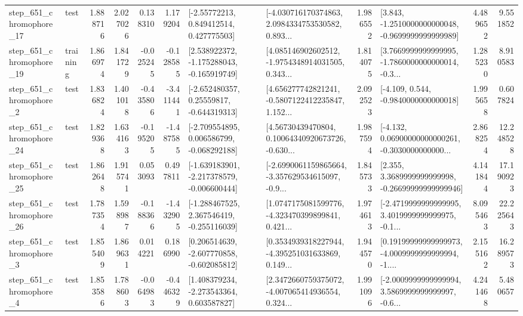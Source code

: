 \begin{tabular}{llrrrrllrlrr}
  step\_651\_chromophore\_17 &      test &      1.888716 &    2.027026 &      0.138310 &  1.179204 &     [-2.55772213, 0.849412514, 0.427775503] &  [-4.030716170374863, 2.0984334753530582, 0.893... &       1.986552 &  [3.843, -1.2510000000000048, -0.9699999999999989] &            4.489652 &          9.551852 \\
  step\_651\_chromophore\_19 &  training &      1.866974 &    1.841729 &     -0.025245 & -0.128585 &   [2.538922372, -1.175288043, -0.165919749] &  [4.085146902602512, -1.9754348914031505, 0.343... &       1.814075 &  [3.7669999999999995, -1.7860000000000014, -0.3... &            1.285230 &          8.910583 \\
   step\_651\_chromophore\_2 &      test &      1.836824 &    1.401018 &     -0.435806 & -3.411441 &    [-2.652480357, 0.25559817, -0.644319313] &  [4.656277742821241, -0.5807122412235847, 1.152... &       2.092523 &               [-4.109, 0.544, -0.9840000000000018] &            1.995658 &          0.607824 \\
  step\_651\_chromophore\_24 &      test &      1.829368 &    1.634163 &     -0.195205 & -1.487585 &   [-2.709554895, 0.006586799, -0.068292188] &  [4.56730439470804, 0.10064340920673726, -0.630... &       1.987594 &  [-4.132, 0.06900000000000261, -0.3030000000000... &            2.868254 &         12.248528 \\
  step\_651\_chromophore\_25 &      test &      1.862648 &    1.915741 &      0.053093 &  0.497811 &  [-1.639183901, -2.217378579, -0.006600444] &  [-2.6990061159865664, -3.357629534615097, -0.9... &       1.845733 &  [2.355, 3.3689999999999998, -0.26699999999999946] &            4.141844 &         17.190923 \\
  step\_651\_chromophore\_26 &      test &      1.787354 &    1.598987 &     -0.188366 & -1.432905 &   [-1.288467525, 2.367546419, -0.255116039] &  [1.0747175081599776, -4.323470399899841, 0.421... &       1.974613 &  [-2.4719999999999995, 3.4019999999999975, -0.1... &            8.095463 &         22.225643 \\
   step\_651\_chromophore\_3 &      test &      1.855409 &    1.869631 &      0.014221 &  0.186990 &   [0.206514639, -2.607770858, -0.602085812] &  [0.3534939318227944, -4.395251031633869, 0.149... &       1.944570 &  [0.19199999999999973, -4.0009999999999994, -1.... &            2.155162 &         16.289573 \\
   step\_651\_chromophore\_4 &      test &      1.853586 &    1.788603 &     -0.064983 & -0.446329 &    [1.408379234, -2.273543364, 0.603587827] &  [2.3472660759375072, -4.007065414936554, 0.324... &       1.991096 &  [-2.0009999999999994, 3.5869999999999997, -0.6... &            4.241468 &          5.480657 \\

\end{tabular}
